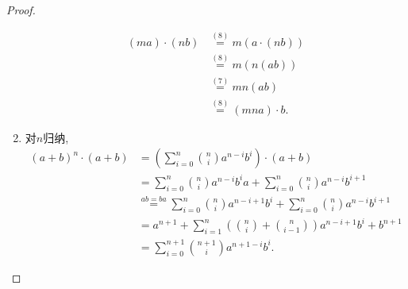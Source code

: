 \documentclass{../solutions-cn}
\begin{document}
\begin{proof}
\begin{enumerate}[(1)]
\[\begin{aligned}
            (ma) \cdot (nb) &\overset{(8)}= m(a \cdot (nb))\\
            &\overset{(8)}= m(n(ab))\\
            &\overset{(7)}= mn(ab)\\
            &\overset{(8)}= (mna) \cdot b.
        \end{aligned}
        \]
        \item 对$n$归纳,
        \[
        \begin{aligned}
            (a + b)^n \cdot (a + b) &= \left(\sum_{i = 0}^{n} \binom{n}{i} a^{n - i}b^i\right) \cdot (a + b)\\
            &= \sum_{i = 0}^{n} \binom{n}{i} a^{n - i}b^ia + \sum_{i = 0}^{n} \binom{n}{i} a^{n - i}b^{i + 1}\\
            &\overset{ab = ba}= \sum_{i = 0}^{n} \binom{n}{i} a^{n - i + 1}b^i + \sum_{i = 0}^{n} \binom{n}{i} a^{n - i}b^{i + 1}\\
            &= a^{n + 1} + \sum_{i = 1}^{n} \left(\binom{n}{i} + \binom{n}{i - 1}\right) a^{n - i + 1}b^{i} + b^{n + 1}\\
            &= \sum_{i = 0}^{n + 1} \binom{n + 1}{i} a^{n + 1 - i}b^i.
        \end{aligned}
        \]
    \end{enumerate}
\end{proof}
\end{document}
